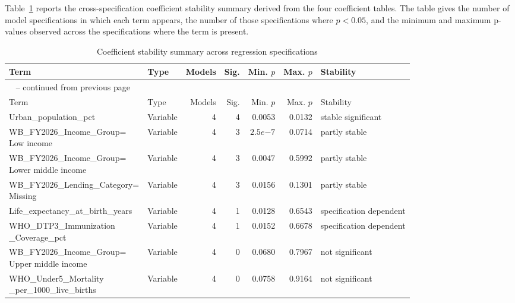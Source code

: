 \documentclass[runningheads]{llncs}
\begin{document}
Table~\ref{tab:appendix-coefficient-stability} reports the cross-specification coefficient stability summary derived from the four coefficient tables. The table gives the number of model specifications in which each term appears, the number of those specifications where $p < 0.05$, and the minimum and maximum p-values observed across the specifications where the term is present.

{\tiny
\renewcommand{\arraystretch}{1.12}
\setlength{\tabcolsep}{2pt}
\begin{longtable}{p{}p{}rr@{\hspace{0.7em}}rrp{}}
\caption{Coefficient stability summary across regression specifications}\label{tab:appendix-coefficient-stability}\\
\hline
Term & Type & Models & Sig. & Min. $p$ & Max. $p$ & Stability \\
\hline
\endfirsthead
\multicolumn{7}{l}{\tablename\ \thetable{} -- continued from previous page}\\
\hline
Term & Type & Models & Sig. & Min. $p$ & Max. $p$ & Stability \\
\hline
\endhead
Urban\_population\_pct & Variable & 4 & 4 & 0.0053 & 0.0132 & stable significant \\
\shortstack[l]{WB\_FY2026\_Income\_Group=\\ Low income} & Variable & 4 & 3 & $2.5e{-7}$ & 0.0714 & partly stable \\
\shortstack[l]{WB\_FY2026\_Income\_Group=\\ Lower middle income} & Variable & 4 & 3 & 0.0047 & 0.5992 & partly stable \\
\shortstack[l]{WB\_FY2026\_Lending\_Category=\\ Missing} & Variable & 4 & 3 & 0.0156 & 0.1301 & partly stable \\
Life\_expectancy\_at\_birth\_years & Variable & 4 & 1 & 0.0128 & 0.6543 & specification dependent \\
\shortstack[l]{WHO\_DTP3\_Immunization\\ \_Coverage\_pct} & Variable & 4 & 1 & 0.0152 & 0.6678 & specification dependent \\
\shortstack[l]{WB\_FY2026\_Income\_Group=\\ Upper middle income} & Variable & 4 & 0 & 0.0680 & 0.7967 & not significant \\
\shortstack[l]{WHO\_Under5\_Mortality\\ \_per\_1000\_live\_births} & Variable & 4 & 0 & 0.0758 & 0.9164 & not significant \\

\end{longtable}}
\end{document}
